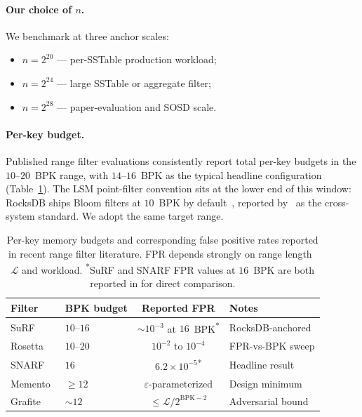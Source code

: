 \paragraph{Our choice of $n$.}
We benchmark at three anchor scales:
\begin{itemize}
    \item $n = 2^{20}$ --- per-SSTable production workload;
    \item $n = 2^{24}$ --- large SSTable or aggregate filter;
    \item $n = 2^{28}$ --- paper-evaluation and SOSD scale.
\end{itemize}

\paragraph{Per-key budget.}
Published range filter evaluations consistently report total per-key
budgets in the $10$--$20$~BPK range, with $14$--$16$~BPK as the typical
headline configuration (Table~\ref{tab:industry-bpk}). The LSM
point-filter convention sits at the lower end of this window: RocksDB
ships Bloom filters at $10$~BPK by default~\citep{rocksdb-bloom},
reported by~\citet{monkey2017} as the cross-system standard. We adopt
the same target range.

\begin{table}[H]
    \centering
    \small
    \setlength{\tabcolsep}{5pt}
    \begin{tabular}{@{}llcl@{}}
        \toprule
        Filter                            & BPK budget & Reported FPR                                   & Notes             \\
        \midrule
        SuRF~\citep{zhang2018surf}        & $10$--$16$ & ${\sim}10^{-3}$ at $16$~BPK\textsuperscript{*} & RocksDB-anchored \\
        Rosetta~\citep{luo2020rosetta}    & $10$--$20$ & $10^{-2}$ to $10^{-4}$                         & FPR-vs-BPK sweep  \\
        SNARF~\citep{vaidya2022snarf}     & $16$       & $6.2 \times 10^{-5}$\textsuperscript{*}        & Headline result   \\
        Memento~\citep{eslami2024memento} & $\geq 12$  & $\varepsilon$-parameterized                    & Design minimum    \\
        Grafite~\citep{grafite2024}       & ${\sim}12$ & $\leq \mathcal{L}/2^{\mathrm{BPK}-2}$          & Adversarial bound \\
        \bottomrule
    \end{tabular}
    \caption{Per-key memory budgets and corresponding false positive rates
    reported in recent range filter literature.
    FPR depends strongly on range length~$\mathcal{L}$ and workload.
    \textsuperscript{*}SuRF and SNARF FPR values at $16$~BPK are both reported in
    \citet{vaidya2022snarf} for direct comparison.}
    \label{tab:industry-bpk}
\end{table}

